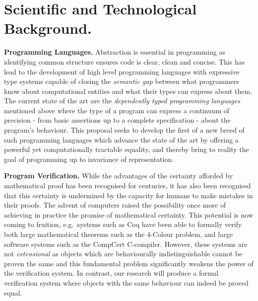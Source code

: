 \documentclass[a4paper,11pt]{article}
\newcommand{\eg}{{e.g.}\ }
\begin{document}

\vspace*{-0.1in} 
\section{Scientific and Technological Background.}
\vspace*{-0.1in} 

{\bf Programming Languages.} Abstraction is essential in programming
as identifying common structure ensures code is clear,
clean and concise. This has lead to the development of high level
programming languages with expressive type systems capable of closing
the {\em semantic gap} between what programmers know about
computational entities and what their types can express about them.
The current state of the art are the {\em dependently typed
  programming languages} mentioned above where
the type of a program can express a
continuum of precision - from basic assertions up to a complete
specification - about the program’s behaviour. This proposal seeks to
develop the first of a new breed of 
such programming languages which advance the state of the art by offering a
powerful yet computationally tractable equality, and thereby bring to
reality the goal of programming up to invariance of representation.


{\bf Program Verification.} While the advantages of the certainty
afforded by mathematical proof has been recognised for centuries, it
has also been recognised that this certainty is undermined by the
capacity for humans to make mistakes in their proofs. The advent of
computers raised the possibility once more of achieving in practice
the promise of mathematical certainty. This potential is now coming to
fruition, \eg systems such as Coq have been able to formally verify
both large mathematical theorems such as the 4-Colour problem, and
large software systems such as the CompCert C-compiler. However, these
systems are not {\em extensional} as objects which are behaviourally
indistinguishable cannot be proven the same and this fundamental problem
significantly weakens the power of the verification system. In contrast, our
research will produce a formal verification system where objects
with the same behaviour can indeed be proved equal.
\end{document}
